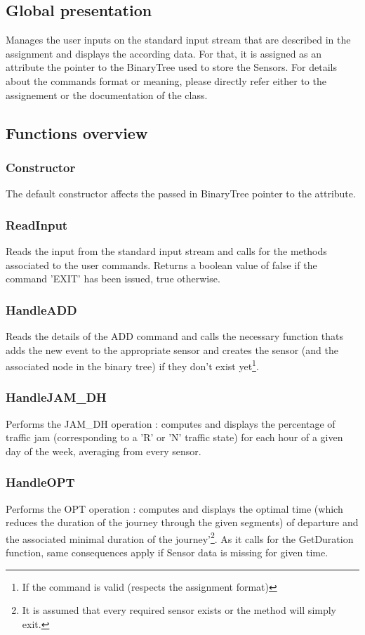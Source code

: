 \documentclass[10pt]{article}
\begin{document}
\subsection{Global presentation}
Manages the user inputs on the standard input stream that are described in the assignment and displays the according data. For that, it is assigned as an attribute the pointer to the BinaryTree used to store the Sensors. For details about the commands format or meaning, please directly refer either to the assignement or the documentation of the class.

\subsection{Functions overview}

\subsubsection*{Constructor}
The default constructor affects the passed in BinaryTree pointer to the attribute.

\subsubsection*{ReadInput}
Reads the input from the standard input stream and calls for the methods associated to the user commands. Returns a boolean value of false if the command 'EXIT' has been issued, true otherwise.

\subsubsection*{HandleADD}
Reads the details of the ADD command and calls the necessary function thats adds the new event to the appropriate sensor and creates the sensor (and the associated node in the binary tree) if they don't exist yet\footnote{ If the command is valid (respects the assignment format)}.

\subsubsection*{HandleJAM\_DH}
Performs the JAM\_DH operation : computes and displays the percentage of traffic jam (corresponding to a 'R' or 'N' traffic state) for each hour of a given day of the week, averaging from every sensor\footnotemark[2].

\subsubsection*{HandleOPT}
Performs the OPT operation : computes and displays the optimal time (which reduces the duration of the journey through the given segments) of departure and the associated minimal duration of the journey\footnotemark[2]'\footnote{ It is assumed that every required sensor exists or the method will simply exit.}. As it calls for the GetDuration function, same consequences apply if Sensor data is missing for given time.
\end{document}
